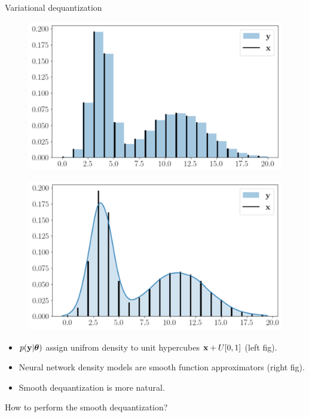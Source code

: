 \begin{frame}{Variational dequantization}
	\begin{minipage}[t]{0.5\columnwidth}
		\begin{figure}
			\centering
			\includegraphics[width=1.0\linewidth]{figs/uniform_dequantization.png}
		\end{figure}
	\end{minipage}%
	\begin{minipage}[t]{0.5\columnwidth}
		\begin{figure}
			\centering
			\includegraphics[width=1.0\linewidth]{figs/variational_dequantization.png}
		\end{figure}
	\end{minipage}
	\begin{itemize}
		\item $p(\mathbf{y} | \boldsymbol{\theta})$ assign unifrom density to unit hypercubes $\mathbf{x} + U[0, 1]$ (left fig).
		\item Neural network density models are smooth function approximators (right fig).
		\item Smooth dequantization is more natural.
	\end{itemize}
	How to perform the smooth dequantization? \\
\end{frame}

